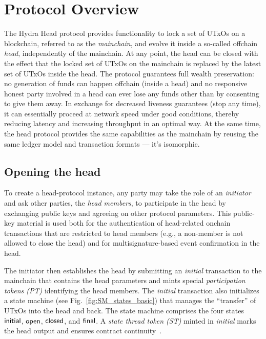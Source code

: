 \section{Protocol Overview}\label{sec:overview}


The Hydra Head protocol provides functionality to lock a set of UTxOs on a
blockchain, referred to as the \emph{mainchain}, and evolve it inside a
so-called offchain \emph{head}, independently of the mainchain. At any point,
the head can be closed with the effect that the locked set of UTxOs on the
mainchain is replaced by the latest set of UTxOs inside the head. The protocol
guarantees full wealth preservation: no generation of funds can happen offchain
(inside a head) and no responsive honest party involved in a head can ever lose
any funds other than by consenting to give them away. In exchange for decreased
liveness guarantees (stop any time), it can essentially proceed at network speed
under good conditions, thereby reducing latency and increasing throughput in an
optimal way. At the same time, the head protocol provides the same capabilities
as the mainchain by reusing the same ledger model and transaction formats --- it's
isomorphic.

\subsection{Opening the head}

To create a head-protocol instance, any party may take the role of an
\emph{initiator} and ask other parties, the \emph{head members}, to participate
in the head by exchanging public keys and agreeing on other protocol parameters.
This public-key material is used both for the authentication of head-related
onchain transactions that are restricted to head members (e.g., a non-member is
not allowed to close the head) and for multisignature-based event confirmation
in the head.

The initiator then establishes the head by submitting an \emph{initial}
transaction to the mainchain that contains the head parameters and mints special
\emph{participation tokens (PT)} identifying the head members. The
\emph{initial} transaction also initializes a state machine (see
Fig.~\ref{fig:SM_states_basic}) that manages the ``transfer'' of UTxOs into the
head and back. The state machine comprises the four states $\mathsf{initial}$,
$\mathsf{open}$, $\mathsf{closed}$, and $\mathsf{final}$. A \emph{state thread token (ST)} minted
in \emph{initial} marks the head output and ensures contract
continuity~\cite{eutxo}.

